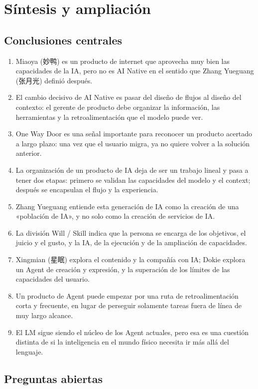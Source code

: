 \section{Síntesis y ampliación}

\subsection{Conclusiones centrales}

\begin{enumerate}
\item Miaoya (妙鸭) es un producto de internet que aprovecha muy bien las capacidades de la IA, pero no es AI Native en el sentido que Zhang Yueguang (张月光) definió después.
\item El cambio decisivo de AI Native es pasar del diseño de flujos al diseño del contexto: el gerente de producto debe organizar la información, las herramientas y la retroalimentación que el modelo puede ver.
\item One Way Door es una señal importante para reconocer un producto acertado a largo plazo: una vez que el usuario migra, ya no quiere volver a la solución anterior.
\item La organización de un producto de IA deja de ser un trabajo lineal y pasa a tener dos etapas: primero se validan las capacidades del modelo y el context; después se encapsulan el flujo y la experiencia.
\item Zhang Yueguang entiende esta generación de IA como la creación de una «población de IA», y no solo como la creación de servicios de IA.
\item La división Will / Skill indica que la persona se encarga de los objetivos, el juicio y el gusto, y la IA, de la ejecución y de la ampliación de capacidades.
\item Xingmian (星眠) explora el contenido y la compañía con IA; Dokie explora un Agent de creación y expresión, y la superación de los límites de las capacidades del usuario.
\item Un producto de Agent puede empezar por una ruta de retroalimentación corta y frecuente, en lugar de perseguir solamente tareas fuera de línea de muy largo alcance.
\item El LM sigue siendo el núcleo de los Agent actuales, pero esa es una cuestión distinta de si la inteligencia en el mundo físico necesita ir más allá del lenguaje.
\end{enumerate}

\subsection{Preguntas abiertas}

